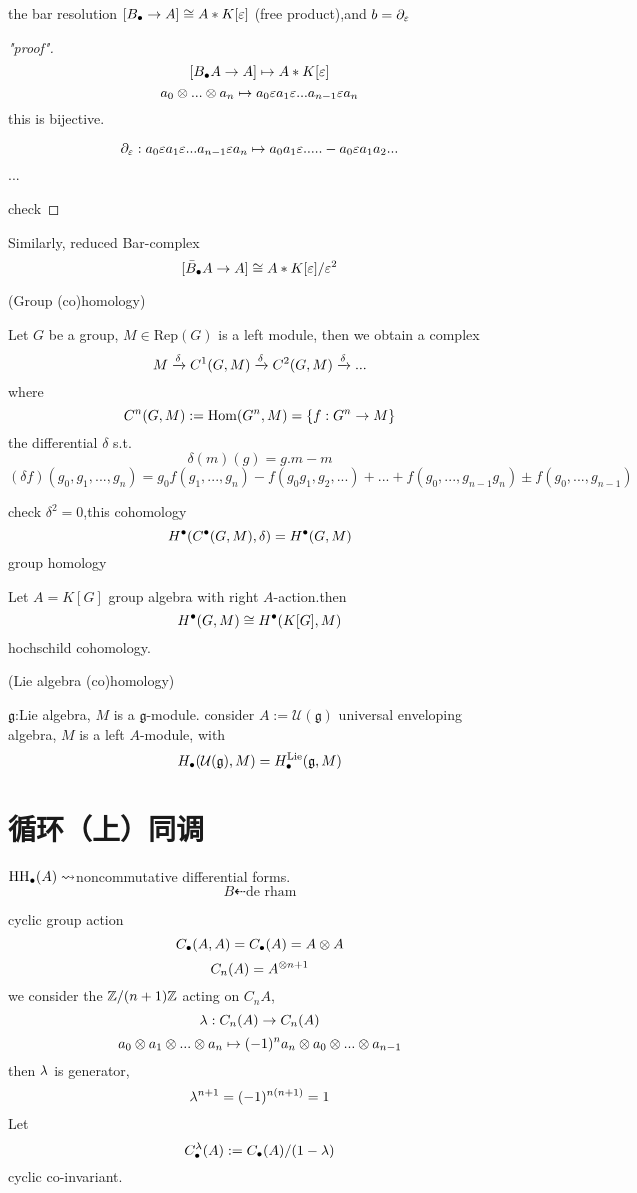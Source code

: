 \begin{prop}
the bar resolution $[B_{\bullet}\to A]\cong A*K[\varepsilon]$
(free product),and $b=\partial_{\varepsilon}$
\end{prop}

\begin{proof}["proof"]
$$[B_{\bullet} A\to A]\mapsto A*K[\varepsilon]$$
$$a_0\otimes...\otimes a_n\mapsto
a_0\varepsilon a_1\varepsilon...a_{n-1}\varepsilon a_n$$
this is bijective.

$$\partial_{\varepsilon}:a_0\varepsilon a_1\varepsilon...a_{n-1}\varepsilon a_n\mapsto
a_0a_1\varepsilon.....-a_0\varepsilon a_1a_2...$$
...

check
\end{proof}

Similarly, reduced Bar-complex
$$[\bar{B}_{\bullet} A\to A]\cong A*K[\varepsilon]/\varepsilon^2$$

\begin{example}(Group (co)homology)

Let $G$ be a group, $M\in\text{Rep}(G)$ is a left module,
then we obtain a complex
$$M\xrightarrow{\delta}C^1(G,M)\xrightarrow{\delta}C^2(G,M)\xrightarrow{\delta}...$$
where
$$C^n(G,M):=\operatorname{Hom}(G^n,M)=\{f:G^n\to M\}$$
the differential $\delta$ s.t.
$$\delta(m)(g)=g.m-m$$
$$(\delta f)(g_0,g_1,...,g_n)=g_0f(g_1,...,g_n)-f(g_0g_1,g_2,...)
+...+f(g_0,...,g_{n-1}g_n)\pm f(g_0,...,g_{n-1})$$

check $\delta^2=0$,this cohomology
$$H^{\bullet}(C^{\bullet}(G,M),\delta)=H^{\bullet}(G,M)$$
group homology
\end{example}

Let $A=K[G]$ group algebra with right $A$-action.then
$$H^{\bullet}(G,M)\cong H^{\bullet}(K[G],M)$$
hochschild cohomology.

\begin{example}(Lie algebra (co)homology)

$\mathfrak{g}$:Lie algebra, $M$ is a $\mathfrak{g}$-module.
consider $A:=\mathcal{U}(\mathfrak{g})$ universal enveloping algebra,
$M$ is a left $A$-module, with
$$H_{\bullet}(\mathcal{U}(\mathfrak{g}),M)
=H^{\text{Lie}}_{\bullet}(\mathfrak{g},M)$$
\end{example}

\section{循环（上）同调}

$\operatorname{HH}_{\bullet}(A)\rightsquigarrow$noncommutative differential forms.
$$B\dashleftarrow\text{de rham}$$

cyclic group action
$$C_{\bullet}(A,A)=C_{\bullet}(A)=A\otimes A$$
$$C_n(A)=A^{\otimes n+1}$$
we consider the $\mathbb{Z}/(n+1)\mathbb{Z}$ acting on $C_n A$,
$$\lambda: C_n(A)\to C_n(A)$$
$$a_0\otimes a_1\otimes...\otimes a_n\mapsto
(-1)^na_n
\otimes a_0\otimes...\otimes a_{n-1}$$
then $\lambda$ is generator,
$$\lambda^{n+1}=(-1)^{n(n+1)}=1$$
Let
$$C^{\lambda}_{\bullet}(A):=C_{\bullet}(A)/(1-\lambda)$$
cyclic co-invariant.

